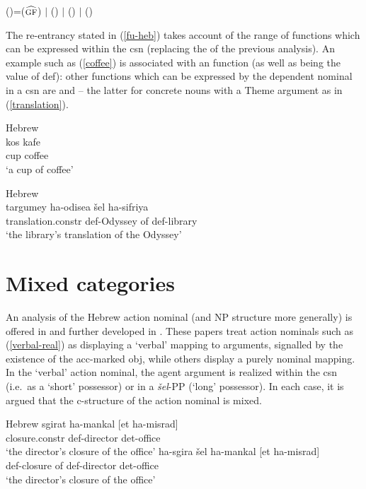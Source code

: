 \documentclass[output=paper,hidelinks]{langscibook}
\begin{document}
\ea  \label{fu-heb}
()=(\UP $\widehat{\textsc{gf}}$) $|$ (\UP{}) $|$ (\UP{})  $|$ (\UP{}) \hfill{\citep[120]{Falk07} }
 \z



The re-entrancy stated in (\ref{fu-heb}) takes account of the range of functions which can be expressed within the {\sc csn} (replacing the {\POSS} of the previous analysis).  An example such as (\ref{coffee}) is associated with an  function (as well as being the value of {\sc def}): other functions which can be expressed by the dependent nominal in a {\sc csn} are  and  -- the latter for concrete nouns with a Theme argument as in (\ref{translation}).

\ea
\label{coffee}  Hebrew \citep[117]{Falk07}\\
\gll kos kafe\\
cup coffee\\
\glt `a cup of coffee'
\z


\ea
\label{translation} Hebrew \citep[122]{Falk07}\\
\gll targumey ha-odisea šel ha-sifriya\\
translation.{\sc constr}  {\sc def}-Odyssey of {\sc def}-library\\
\glt `the library's translation of the Odyssey'
\z





\section{Mixed categories}
An analysis of the Hebrew action nominal  (and NP structure more generally) is offered in \citet{Falk01actnom} and further developed in   \citet{Falk07}.  These papers treat action nominals such as (\ref{verbal-real}) as displaying a `verbal' mapping to arguments, signalled by the existence of the {\sc acc}-marked {\sc obj}, while others display a purely nominal mapping. In the `verbal' action nominal, the agent argument is realized within the {\sc csn} (i.e.\ as a `short' possessor) or in a {\em šel}-PP (`long' possessor).  In each case, it is argued that the c-structure of the action nominal is mixed.

\ea
\label{verbal-real}  Hebrew \citep[117]{Falk07}
\ea \gll sgirat ha-mankal  [et ha-misrad]\\
closure.{\sc constr} {\sc def}-director \phantom{[}{\sc acc} {\sc det}-office\\
\glt `the director's closure of the office'
\ex \gll ha-sgira šel ha-mankal  [et ha-misrad]\\
{\sc def}-closure of {\sc def}-director \phantom{[}{\sc acc} {\sc det}-office\\
\glt `the director's closure of the office'
\z
\z
\end{document}
